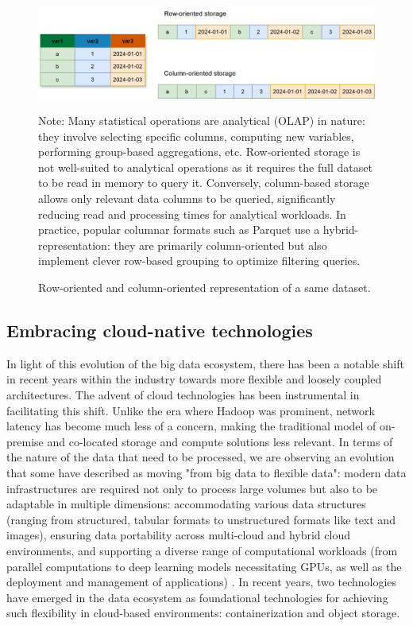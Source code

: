 \begin{figure}[htbp]
    \includegraphics[width=\linewidth]{sections/img/columnar-storage.png}
    \caption{Row-oriented and column-oriented representation of a same dataset.}
    \label{fig:columnar-storage}
    \medskip
    {\footnotesize Note: Many statistical operations are analytical (OLAP) in nature: they involve selecting specific columns, computing new variables, performing group-based aggregations, etc. Row-oriented storage is not well-suited to analytical operations as it requires the full dataset to be read in memory to query it. Conversely, column-based storage allows only relevant data columns to be queried, significantly reducing read and processing times for analytical workloads. In practice, popular columnar formats such as Parquet use a hybrid-representation: they are primarily column-oriented but also implement clever row-based grouping to optimize filtering queries.}
\end{figure}

\subsection{Embracing cloud-native technologies}

In light of this evolution of the big data ecosystem, there has been a notable shift in recent years within the industry towards more flexible and loosely coupled architectures. The advent of cloud technologies has been instrumental in facilitating this shift. Unlike the era where Hadoop was prominent, network latency has become much less of a concern, making the traditional model of on-premise and co-located storage and compute solutions less relevant. In terms of the nature of the data that need to be processed, we are observing an evolution that some have described as moving "from big data to flexible data": modern data infrastructures are required not only to process large volumes but also to be adaptable in multiple dimensions: accommodating various data structures (ranging from structured, tabular formats to unstructured formats like text and images), ensuring data portability across multi-cloud and hybrid cloud environments, and supporting a diverse range of computational workloads (from parallel computations to deep learning models necessitating GPUs, as well as the deployment and management of applications) \cite{li2020big}. In recent years, two technologies have emerged in the data ecosystem as foundational technologies for achieving such flexibility in cloud-based environments: containerization and object storage. 


